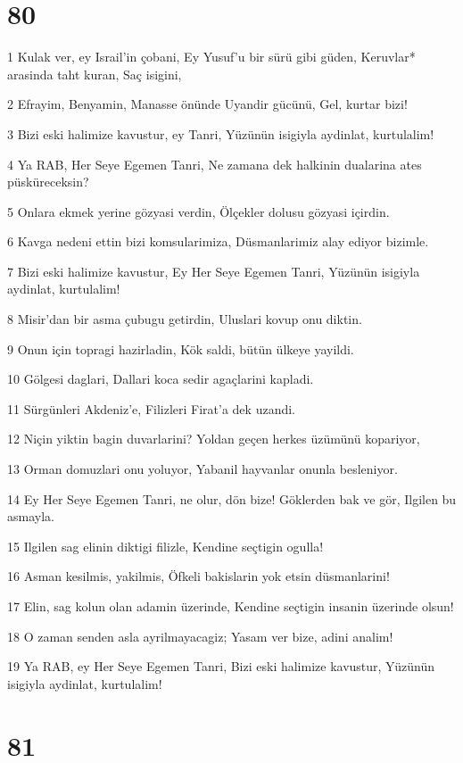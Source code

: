 \chapter{80}

\par 1 Kulak ver, ey Israil'in çobani, Ey Yusuf'u bir sürü gibi güden, Keruvlar* arasinda taht kuran, Saç isigini,
\par 2 Efrayim, Benyamin, Manasse önünde Uyandir gücünü, Gel, kurtar bizi!
\par 3 Bizi eski halimize kavustur, ey Tanri, Yüzünün isigiyla aydinlat, kurtulalim!
\par 4 Ya RAB, Her Seye Egemen Tanri, Ne zamana dek halkinin dualarina ates püsküreceksin?
\par 5 Onlara ekmek yerine gözyasi verdin, Ölçekler dolusu gözyasi içirdin.
\par 6 Kavga nedeni ettin bizi komsularimiza, Düsmanlarimiz alay ediyor bizimle.
\par 7 Bizi eski halimize kavustur, Ey Her Seye Egemen Tanri, Yüzünün isigiyla aydinlat, kurtulalim!
\par 8 Misir'dan bir asma çubugu getirdin, Uluslari kovup onu diktin.
\par 9 Onun için topragi hazirladin, Kök saldi, bütün ülkeye yayildi.
\par 10 Gölgesi daglari, Dallari koca sedir agaçlarini kapladi.
\par 11 Sürgünleri Akdeniz'e, Filizleri Firat'a dek uzandi.
\par 12 Niçin yiktin bagin duvarlarini? Yoldan geçen herkes üzümünü kopariyor,
\par 13 Orman domuzlari onu yoluyor, Yabanil hayvanlar onunla besleniyor.
\par 14 Ey Her Seye Egemen Tanri, ne olur, dön bize! Göklerden bak ve gör, Ilgilen bu asmayla.
\par 15 Ilgilen sag elinin diktigi filizle, Kendine seçtigin ogulla!
\par 16 Asman kesilmis, yakilmis, Öfkeli bakislarin yok etsin düsmanlarini!
\par 17 Elin, sag kolun olan adamin üzerinde, Kendine seçtigin insanin üzerinde olsun!
\par 18 O zaman senden asla ayrilmayacagiz; Yasam ver bize, adini analim!
\par 19 Ya RAB, ey Her Seye Egemen Tanri, Bizi eski halimize kavustur, Yüzünün isigiyla aydinlat, kurtulalim!

\chapter{81}

